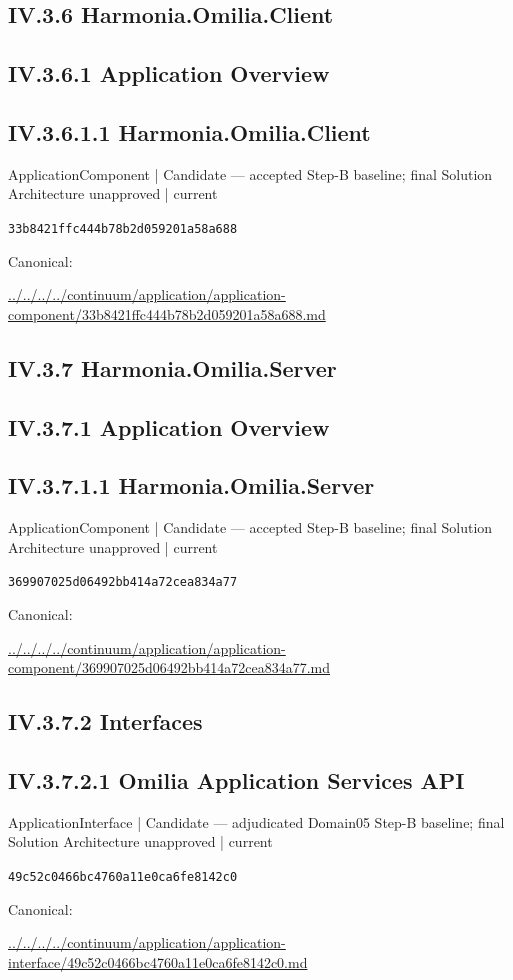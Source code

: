 \documentclass[10pt,a4paper]{article}
\begin{document}
\subsection*{IV.3.6 Harmonia.Omilia.Client}
\subsection*{IV.3.6.1 Application Overview}
\subsection*{IV.3.6.1.1 Harmonia.Omilia.Client}
\label{element-33b8421ffc444b78b2d059201a58a688}
{\small ApplicationComponent | Candidate — accepted Step-B baseline; final Solution Architecture unapproved | current}\par
\texttt{33b8421ffc444b78b2d059201a58a688}\par
Canonical: \par
{\footnotesize\url{../../../../continuum/application/application-component/33b8421ffc444b78b2d059201a58a688.md}}\par
\subsection*{IV.3.7 Harmonia.Omilia.Server}
\subsection*{IV.3.7.1 Application Overview}
\subsection*{IV.3.7.1.1 Harmonia.Omilia.Server}
\label{element-369907025d06492bb414a72cea834a77}
{\small ApplicationComponent | Candidate — accepted Step-B baseline; final Solution Architecture unapproved | current}\par
\texttt{369907025d06492bb414a72cea834a77}\par
Canonical: \par
{\footnotesize\url{../../../../continuum/application/application-component/369907025d06492bb414a72cea834a77.md}}\par
\subsection*{IV.3.7.2 Interfaces}
\subsection*{IV.3.7.2.1 Omilia Application Services API}
\label{element-49c52c0466bc4760a11e0ca6fe8142c0}
{\small ApplicationInterface | Candidate — adjudicated Domain05 Step-B baseline; final Solution Architecture unapproved | current}\par
\texttt{49c52c0466bc4760a11e0ca6fe8142c0}\par
Canonical: \par
{\footnotesize\url{../../../../continuum/application/application-interface/49c52c0466bc4760a11e0ca6fe8142c0.md}}\par
\end{document}
